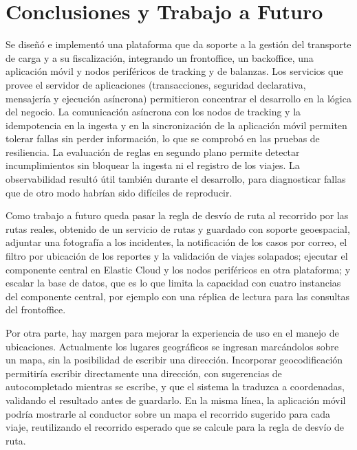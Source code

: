 \section{Conclusiones y Trabajo a Futuro}

Se diseñó e implementó una plataforma que da soporte a la gestión del transporte de carga y a su fiscalización, integrando un frontoffice, un backoffice, una aplicación móvil y nodos periféricos de tracking y de balanzas. Los servicios que provee el servidor de aplicaciones (transacciones, seguridad declarativa, mensajería y ejecución asíncrona) permitieron concentrar el desarrollo en la lógica del negocio. La comunicación asíncrona con los nodos de tracking y la idempotencia en la ingesta y en la sincronización de la aplicación móvil permiten tolerar fallas sin perder información, lo que se comprobó en las pruebas de resiliencia. La evaluación de reglas en segundo plano permite detectar incumplimientos sin bloquear la ingesta ni el registro de los viajes. La observabilidad resultó útil también durante el desarrollo, para diagnosticar fallas que de otro modo habrían sido difíciles de reproducir.

Como trabajo a futuro queda pasar la regla de desvío de ruta al recorrido por las rutas reales, obtenido de un servicio de rutas y guardado con soporte geoespacial, adjuntar una fotografía a los incidentes, la notificación de los casos por correo, el filtro por ubicación de los reportes y la validación de viajes solapados; ejecutar el componente central en Elastic Cloud y los nodos periféricos en otra plataforma; y escalar la base de datos, que es lo que limita la capacidad con cuatro instancias del componente central, por ejemplo con una réplica de lectura para las consultas del frontoffice.

Por otra parte, hay margen para mejorar la experiencia de uso en el manejo de ubicaciones. Actualmente los lugares geográficos se ingresan marcándolos sobre un mapa, sin la posibilidad de escribir una dirección. Incorporar geocodificación permitiría escribir directamente una dirección, con sugerencias de autocompletado mientras se escribe, y que el sistema la traduzca a coordenadas, validando el resultado antes de guardarlo. En la misma línea, la aplicación móvil podría mostrarle al conductor sobre un mapa el recorrido sugerido para cada viaje, reutilizando el recorrido esperado que se calcule para la regla de desvío de ruta.
